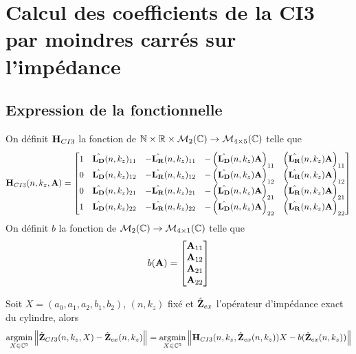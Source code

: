 \section{Calcul des coefficients de la CI3 par moindres carrés sur l'impédance}

  \subsection{Expression de la fonctionnelle}

    \begin{defn}
      On définit \(\mathbf{H}_{CI3}\) la fonction de \(\mathbb N \times \mathbb R \times \mathcal{M}_2(\mathbb C) \rightarrow \mathcal{M}_{4\times5}(\mathbb C)\) telle que
      \begin{equation*}
        \mathbf{H}_{CI3}(n,k_z,\mathbf{A}) = \begin{bmatrix}
        1 & \hat{\mathbf{L_D}}(n,k_z)_{11} & -\hat{\mathbf{L_R}}(n,k_z)_{11} & -\left(\hat{\mathbf{L_D}}(n,k_z){\mathbf{A}}\right)_{11} & \left(\hat{\mathbf{L_R}}(n,k_z){\mathbf{A}}\right)_{11}
        \\
        0 & \hat{\mathbf{L_D}}(n,k_z)_{12} & -\hat{\mathbf{L_R}}(n,k_z)_{12} & -\left(\hat{\mathbf{L_D}}(n,k_z){\mathbf{A}}\right)_{12} & \left(\hat{\mathbf{L_R}}(n,k_z){\mathbf{A}}\right)_{12}
        \\
        0 & \hat{\mathbf{L_D}}(n,k_z)_{21} & -\hat{\mathbf{L_R}}(n,k_z)_{21} & -\left(\hat{\mathbf{L_D}}(n,k_z){\mathbf{A}}\right)_{21} & \left(\hat{\mathbf{L_R}}(n,k_z){\mathbf{A}}\right)_{21}
        \\
        1 & \hat{\mathbf{L_D}}(n,k_z)_{22} & -\hat{\mathbf{L_R}}(n,k_z)_{22} & -\left(\hat{\mathbf{L_D}}(n,k_z){\mathbf{A}}\right)_{22} & \left(\hat{\mathbf{L_R}}(n,k_z){\mathbf{A}}\right)_{22}
        \end{bmatrix}
      \end{equation*}
      On définit \(b\) la fonction de \(\mathcal{M}_2(\mathbb C) \rightarrow \mathcal{M}_{4\times1}(\mathbb C)\) telle que
      \begin{equation*}
        b(\mathbf{A}) = \begin{bmatrix}
        {\mathbf{A}}_{11}
        \\
        {\mathbf{A}}_{12}
        \\
        {\mathbf{A}}_{21}
        \\
        {\mathbf{A}}_{22}
        \end{bmatrix}
      \end{equation*}
    \end{defn}

    \begin{prop}
      Soit \(X = (a_0,a_1,a_2,b_1,b_2)\), \((n,k_z)\) fixé et \(\hat{\mathbf{Z}}_{ex}\) l'opérateur d'impédance exact du cylindre, alors
      \begin{equation*}
        {\underset{X\in\mathbb C^5}{\operatorname{argmin}}} \left\lVert\hat{\mathbf{Z}}_{CI3}(n,k_z,X) - \hat{\mathbf{Z}}_{ex}(n,k_z)\right\rVert = {\underset{X\in\mathbb C^5}{\operatorname{argmin}}} \left\lVert\mathbf{H}_{CI3}(n,k_z,\hat{\mathbf{Z}}_{ex}(n,k_z))X - b(\hat{\mathbf{Z}}_{ex}(n,k_z))\right\rVert
      \end{equation*}
    \end{prop}

